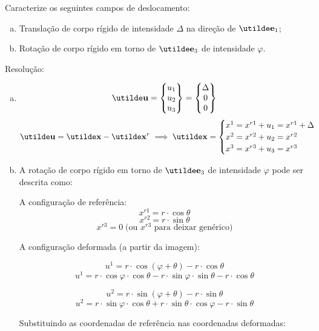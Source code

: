 Caracterize os seguintes campos de deslocamento:
	
\begin{enumerate}[a)]
	\item Translação de corpo rígido de intensidade $\Delta$ na direção de $\vt{e}_1$;
	\item Rotação de corpo rígido em torno de $\vt{e}_3$ de intensidade $\varphi$.
\end{enumerate}
	
Resolução:
	
\begin{enumerate}[a)]
	\item
		\[
		\vt{u}=
			\begin{Bmatrix}
			u_1 \\ u_2 \\ u_3
			\end{Bmatrix}
			=
			\begin{Bmatrix}
				\Delta \\ 0 \\ 0
			\end{Bmatrix}
		\]
		\[\vt{u}=\vt{x}-\vt{x}^r
		\implies
		\vt{x}=
		\begin{cases} x^1=x^{r1}+u_1=x^{r1}+\Delta \\ x^2=x^{r2}+u_2=x^{r2} \\ x^3=x^{r3}+u_3=x^{r3}
		\end{cases}
		\]
	\item A rotação de corpo rígido em torno de $\vt{e}_3$ de intensidade $\varphi$ pode ser descrita como:
		\begin{figure}[H]
			\centering
			
		\end{figure}
			
		A configuração de referência:
		\[x^{r1}=r\cdot \cos\theta\]
		\[x^{r2}=r\cdot\sin\theta\]
		\[x^{r3}=0\;\text{(ou }x^{r3}\text{ para deixar genérico})\]
			
		A configuração deformada (a partir da imagem):
			
		\[u^1=r\cdot\cos(\varphi+\theta)-r\cdot\cos\theta\]
		\[u^1=r\cdot\cos\varphi\cdot\cos\theta-r\cdot\sin\varphi\cdot\sin\theta-r\cdot\cos\theta\]
			
		\[u^2=r\cdot\sin(\varphi+\theta)-r\cdot\sin\theta\]
		\[u^2=r\cdot\sin\varphi\cdot\cos\theta+r\cdot\sin\theta\cdot\cos\varphi-r\cdot\sin\theta\]
			
		Substituindo as coordenadas de referência nas coordenadas deformadas:


\end{enumerate}
